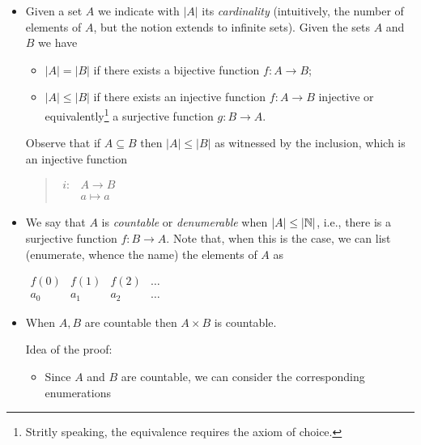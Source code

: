 \begin{itemize}
\item Given a set $A$ we indicate with $|A|$ its \emph{cardinality}
  (intuitively, the number of elements of $A$, but the notion extends
  to infinite sets). Given the sets $A$ and $B$ we have
  \begin{itemize}
  \item $|A| = |B|$ if there exists a bijective function $f : A \to B$;
  \item $|A| \leq |B|$ if there exists an injective function
    $f: A \to B$ injective or equivalently\footnote{Stritly speaking,
      the equivalence requires the axiom of choice.} a surjective
    function $g : B \to A$.
  \end{itemize}
  Observe that if $A \subseteq B$ then $|A| \leq |B|$ as witnessed by
  the inclusion, which is an injective function
  \begin{quote}
    $\begin{array}{cc}
       i: & A \to B  \\
          & a \mapsto a
     \end{array}$
   \end{quote}

 \item We say that $A$ is \emph{countable} or \emph{denumerable} when
   $|A| \leq |\mathbb{N}|$, i.e., there is a surjective function
   $f: B \to A$. Note that, when this is the case, we can
   list (enumerate, whence the name) the elements of $A$ as
   \begin{center}
     $\begin{array}{cccc}
        f(0) & f(1) & f(2) & \dots\\
        a_0  & a_1  & a_2 & \dots
      \end{array}
      $
    \end{center}

  \item When $A, B$ are countable then $A\times B$ is countable.

    Idea of the proof:
    \begin{itemize}
    \item Since $A$ and $B$ are countable, we can consider the
      corresponding enumerations


\end{itemize}
\end{itemize}
